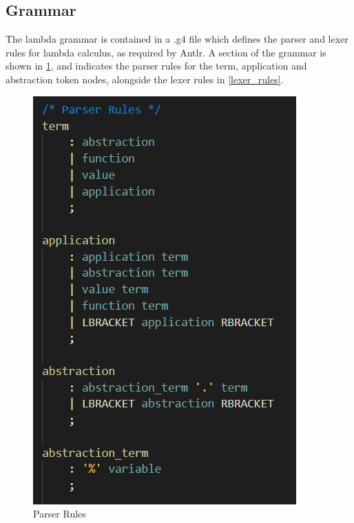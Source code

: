\documentclass[a4paper,12pt]{report}
\begin{document}
\subsection{Grammar}

The lambda grammar is contained in a .g4 file which defines the parser and lexer rules for lambda calculus, as required by Antlr. A section of the grammar is shown in \ref{parser_rules}, and indicates the parser rules for the term, application and abstraction token nodes, alongside the lexer rules in \ref{lexer_rules}.

\begin{figure}[p]
\centering
\includegraphics{images/parser_rules}
\caption{Parser Rules}
\label{parser_rules}
\end{figure}
\end{document}
